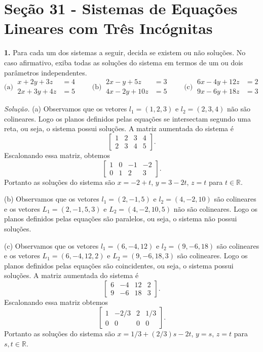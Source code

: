\documentclass[a4paper,11pt]{article}
\newcommand{\R}{\mathbb{R}}
\begin{document}
\section*{Seção 31 - Sistemas de Equações Lineares com Três Incógnitas}

\textbf{1.}
Para cada um dos sistemas a seguir, decida se existem ou não soluções.
No caso afirmativo, exiba todas as soluções do sistema em termos de um ou dois parâmetros independentes.
\[
  \text{(a)} \
  \begin{aligned}
    x + 2y + 3z & = 4 \\
    2x + 3y + 4z & = 5
  \end{aligned}
  \qquad
  \text{(b)} \
  \begin{aligned}
    2x - y + 5z & = 3 \\
    4x - 2y + 10z & = 5
  \end{aligned}
  \qquad
  \text{(c)} \
  \begin{aligned}
    6x - 4y + 12z & = 2 \\
    9x - 6y + 18z & = 3
  \end{aligned}
\]

\vspace{\baselineskip}

\emph{Solução.}
(a)
Observamos que os vetores $l_1 = (1,2,3)$ e $l_2 = (2,3,4)$ não são colineares.
Logo os planos definidos pelas equações se intersectam segundo uma reta, ou seja, o sistema possui soluções.
A matriz aumentada do sistema é
\[
  \begin{bmatrix}
    1 & 2 & 3 & 4 \\
    2 & 3 & 4 & 5
  \end{bmatrix}.
\]
Escalonando essa matriz, obtemos
\[
  \begin{bmatrix}
    1 & 0 & -1 & -2 \\
    0 & 1 & 2 & 3
  \end{bmatrix}.
\]
Portanto as soluções do sistema são $x = -2 + t$, $y = 3 - 2t$, $z = t$ para $t \in \R$.

(b)
Observamos que os vetores $l_1 = (2,-1,5)$ e $l_2 = (4,-2,10)$ são colineares e os vetores $L_1 = (2,-1,5,3)$ e $L_2 = (4,-2,10,5)$ não são colineares.
Logo os planos definidos pelas equações são paralelos, ou seja, o sistema não possui soluções.

(c)
Observamos que os vetores $l_1 = (6,-4,12)$ e $l_2 = (9,-6,18)$ são colineares e os vetores $L_1 = (6,-4,12,2)$ e $L_2 = (9,-6,18,3)$ são colineares.
Logo os planos definidos pelas equações são coincidentes, ou seja, o sistema possui soluções.
A matriz aumentada do sistema é
\[
  \begin{bmatrix}
    6 & -4 & 12 & 2 \\
    9 & -6 & 18 & 3
  \end{bmatrix}.
\]
Escalonando essa matriz obtemos
\[
  \begin{bmatrix}
    1 & -2/3 & 2 & 1/3 \\
    0 & 0 & 0 & 0
  \end{bmatrix}.
\]
Portanto as soluções do sistema são $x = 1/3 + (2/3)s - 2t$, $y = s$, $z = t$ para $s, t \in \R$.
\end{document}

